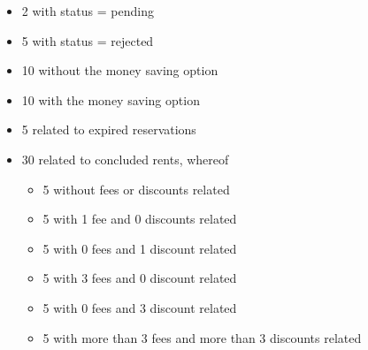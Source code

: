 \begin{itemize}
	\begin{itemize}
		\item 2 with status = pending
		\item 5 with status = rejected
		\item 10 without the money saving option
		\item 10 with the money saving option
		\item 5 related to expired reservations
		\item 30 related to concluded rents, whereof
		\begin{itemize}
			\item 5 without fees or discounts related
			\item 5 with 1 fee and 0 discounts related
			\item 5 with 0 fees and 1 discount related
			\item 5 with 3 fees and 0 discount related
			\item 5 with 0 fees and 3 discount related
			\item 5 with more than 3 fees and more than 3 discounts related
		\end{itemize}
	\end{itemize}
\end{itemize}
